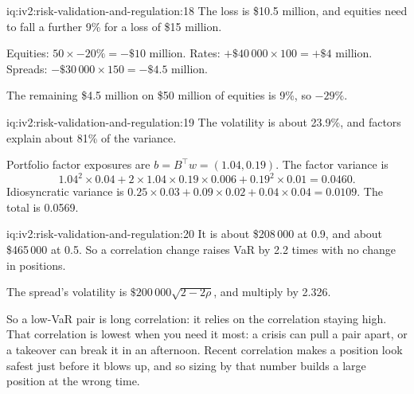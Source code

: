 \begin{solution}{iq:iv2:risk-validation-and-regulation:18}
The loss is \$10.5 million, and equities need to fall a further 9\% for a loss of \$15 million.

Equities: $50 \times -20\% = -\$10$ million. Rates: $+\$40\,000 \times 100 = +\$4$ million. Spreads: $-\$30\,000 \times 150 = -\$4.5$ million.

The remaining \$4.5 million on \$50 million of equities is 9\%, so $-29\%$.

\end{solution}

\begin{solution}{iq:iv2:risk-validation-and-regulation:19}
The volatility is about 23.9\%, and factors explain about 81\% of the variance.

Portfolio factor exposures are $b = B^\top w = (1.04, 0.19)$. The factor variance is
\[
1.04^2 \times 0.04 + 2 \times 1.04 \times 0.19 \times 0.006 + 0.19^2 \times 0.01 = 0.0460.
\]
Idiosyncratic variance is $0.25 \times 0.03 + 0.09 \times 0.02 + 0.04 \times 0.04 = 0.0109$. The total is 0.0569.

\end{solution}

\begin{solution}{iq:iv2:risk-validation-and-regulation:20}
It is about \$208\,000 at 0.9, and about \$465\,000 at 0.5. So a correlation change raises VaR by 2.2 times with no change in positions.

The spread's volatility is $\$200\,000\sqrt{2 - 2\rho}$, and multiply by 2.326.

So a low-VaR pair is long correlation: it relies on the correlation staying high. That correlation is lowest when you need it most: a crisis can pull a pair apart, or a takeover can break it in an afternoon. Recent correlation makes a position look safest just before it blows up, and so sizing by that number builds a large position at the wrong time.

\end{solution}

